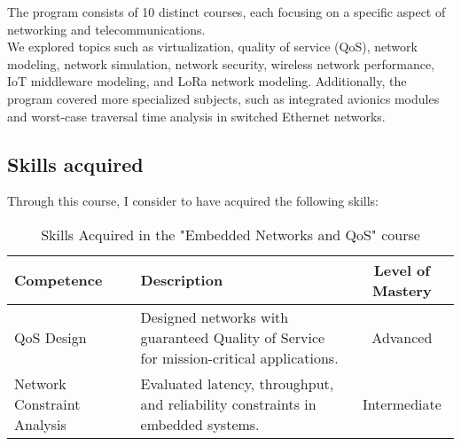 \noindent The program consists of 10 distinct courses, each focusing on a specific aspect of networking and telecommunications.
\\
We explored topics such as virtualization, quality of service (QoS), network modeling, network simulation, network security, wireless network performance, IoT middleware modeling, and LoRa network modeling.
Additionally, the program covered more specialized subjects, such as integrated avionics modules and worst-case traversal time analysis in switched Ethernet networks.

\subsection{Skills acquired}
Through this course, I consider to have acquired the following skills:


\begin{table}[H]
    \centering
    \renewcommand{\arraystretch}{1.5} %
    \begin{tabular}{|p{3.5cm}|p{8cm}|c|}
    \hline
    \rowcolor[gray]{0.8}
    \textbf{Competence} & \textbf{Description} & \textbf{Level of Mastery} \\
    \hline
        QoS Design & Designed networks with guaranteed Quality of Service for mission-critical applications. & Advanced \\ \hline
        Network Constraint Analysis & Evaluated latency, throughput, and reliability constraints in embedded systems. & Intermediate \\ \hline
        \end{tabular}
        \caption{Skills Acquired in the "Embedded Networks and QoS" course}
        \end{table}
        
